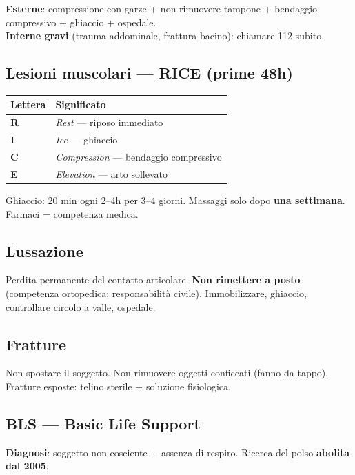 \documentclass[12pt, a4paper]{article}
\begin{document}
\medskip
\textbf{Esterne}: compressione con garze + non rimuovere tampone + bendaggio compressivo + ghiaccio + ospedale.\\
\textbf{Interne gravi} (trauma addominale, frattura bacino): chiamare 112 subito.

\subsection{Lesioni muscolari --- RICE (prime 48h)}

\begin{tabular}{ll}
\toprule
\rowcolor{light} \textbf{Lettera} & \textbf{Significato} \\
\midrule
\textbf{R} & \textit{Rest} --- riposo immediato \\
\textbf{I} & \textit{Ice} --- ghiaccio \\
\textbf{C} & \textit{Compression} --- bendaggio compressivo \\
\textbf{E} & \textit{Elevation} --- arto sollevato \\
\bottomrule
\end{tabular}

\medskip
Ghiaccio: 20 min ogni 2--4h per 3--4 giorni. Massaggi solo dopo \textbf{una settimana}. Farmaci = competenza medica.

\subsection{Lussazione}

Perdita permanente del contatto articolare. \textbf{Non rimettere a posto} (competenza ortopedica; responsabilità civile). Immobilizzare, ghiaccio, controllare circolo a valle, ospedale.

\subsection{Fratture}

Non spostare il soggetto. Non rimuovere oggetti conficcati (fanno da tappo). Fratture esposte: telino sterile + soluzione fisiologica.

\subsection{BLS --- Basic Life Support}

\textbf{Diagnosi}: soggetto non cosciente + assenza di respiro. Ricerca del polso \textbf{abolita dal 2005}.
\end{document}
